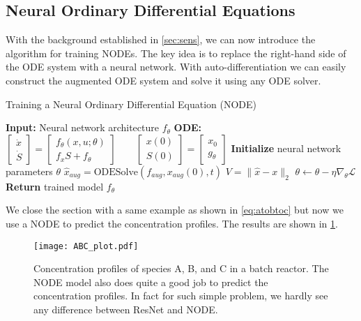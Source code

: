 \documentclass[fontsize=11pt]{article}
\newcommand{\norm}[1]{\lVert #1 \rVert}
\theoremstyle{definition}
\begin{document}
\subsection{Neural Ordinary Differential Equations}

With the background established in \cref{sec:sens}, we can now introduce the algorithm
for training NODEs. The key idea is to replace the right-hand side of the ODE system
with a neural network. With auto-differentiation we can easily construct the augmented
ODE system and solve it using any ODE solver. 

\begin{algorithm}[h]
\caption{Training a Neural Ordinary Differential Equation (NODE)}
\label{alg:NODE}
\begin{algorithmic}[1]
\State \textbf{Input:} Neural network architecture $f_{\theta}$
\State \textbf{ODE:} 
$
    \begin{bmatrix} \dot{x} \\ \dot{S} \end{bmatrix} = 
    \begin{bmatrix} f_\theta(x, u; \theta) \\ f_xS + f_{\theta} \end{bmatrix}
    \qquad
    \begin{bmatrix} x(0) \\ S(0) \end{bmatrix} =
    \begin{bmatrix} x_0 \\ g_\theta \end{bmatrix}
    \label{eq:augsens}
$
\State \textbf{Initialize} neural network parameters $\theta$
\Repeat
    \State $\hat{x}_{aug} = \text{ODESolve}(f_{aug}, x_{aug}(0), t)$
    \State $V = \norm{\hat{x} - x}_{2}$
    \State $\theta \leftarrow \theta - \eta \nabla_{\theta} \mathcal{L}$
\State \textbf{Return} trained model $f_{\theta}$
\end{algorithmic}
\end{algorithm}
We close the section with a same example as shown in \cref{eq:atobtoc} but now
we use a NODE to predict the concentration profiles. The results are shown in
\cref{fig:node}.

\begin{figure}[h]
    \centering
    \texttt{[image: ABC\_plot.pdf]} 
    \caption{Concentration profiles of species A, B, and C in a batch reactor. The
    NODE model also does quite a good job to predict the concentration profiles. 
    In fact for such simple problem, we hardly see any difference between ResNet and NODE.}
    \label{fig:node}
\end{figure}
\end{document}
